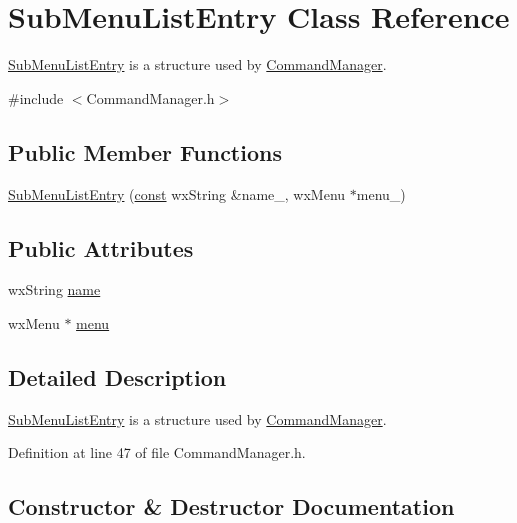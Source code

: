\hypertarget{struct_sub_menu_list_entry}{}\section{Sub\+Menu\+List\+Entry Class Reference}
\label{struct_sub_menu_list_entry}


\hyperlink{struct_sub_menu_list_entry}{Sub\+Menu\+List\+Entry} is a structure used by \hyperlink{class_command_manager}{Command\+Manager}.  




{\ttfamily \#include $<$Command\+Manager.\+h$>$}

\subsection*{Public Member Functions}
\begin{DoxyCompactItemize}
\item 
\hyperlink{struct_sub_menu_list_entry_a791aded55ab252aa2929a5f65d8eb416}{Sub\+Menu\+List\+Entry} (\hyperlink{getopt1_8c_a2c212835823e3c54a8ab6d95c652660e}{const} wx\+String \&name\+\_\+, wx\+Menu $\ast$menu\+\_\+)
\end{DoxyCompactItemize}
\subsection*{Public Attributes}
\begin{DoxyCompactItemize}
\item 
wx\+String \hyperlink{struct_sub_menu_list_entry_aa3e74d0e30f37d6a31071183a4e96b66}{name}
\item 
wx\+Menu $\ast$ \hyperlink{struct_sub_menu_list_entry_aff0cfa9551e9624434d3c93077613691}{menu}
\end{DoxyCompactItemize}


\subsection{Detailed Description}
\hyperlink{struct_sub_menu_list_entry}{Sub\+Menu\+List\+Entry} is a structure used by \hyperlink{class_command_manager}{Command\+Manager}. 

Definition at line 47 of file Command\+Manager.\+h.



\subsection{Constructor \& Destructor Documentation}
